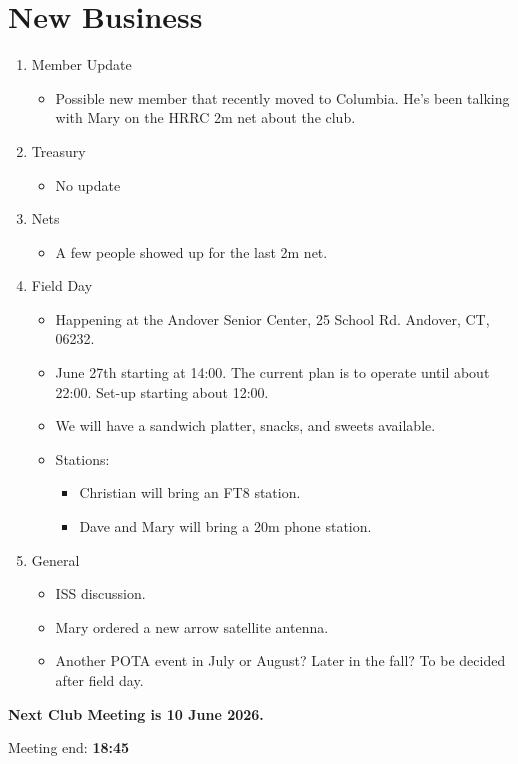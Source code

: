 \documentclass[12pt, letterpaper]{article}
\begin{document}
\section{New Business}
    \begin{enumerate}
    \item Member Update
        \begin{itemize}
            \item  Possible new member that recently moved to Columbia. He's been talking with Mary on the HRRC 2m net about the club.
        \end{itemize}
    \item Treasury
        \begin{itemize}
            \item No update
        \end{itemize}
    \item Nets
        \begin{itemize}
            \item A few people showed up for the last 2m net.
        \end{itemize}
    \item Field Day
        \begin{itemize}
            \item Happening at the Andover Senior Center, 25 School Rd. Andover, CT, 06232. 
            \item June 27th starting at 14:00. The current plan is to operate until about 22:00. Set-up starting about 12:00.
            \item We will have a sandwich platter, snacks, and sweets available.
            \item Stations:
            \begin{itemize}
                \item Christian will bring an FT8 station.
                \item Dave and Mary will bring a 20m phone station. 
            \end{itemize}
        \end{itemize}
    \item General
        \begin{itemize}
            \item ISS discussion.
            \item Mary ordered a new arrow satellite antenna.
            \item Another POTA event in July or August? Later in the fall? To be decided after field day.
        \end{itemize}
    \end{enumerate}

    \textbf{\Large{Next Club Meeting is 10 June 2026.}}

    Meeting end: \textbf{18:45}
\end{document}
